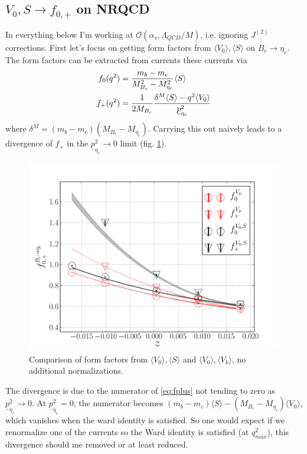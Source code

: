 \subsection{$V_0,S\to f_{0,+}$ on NRQCD}
\label{sec:V0Sf0p}

In everything below I'm working at $\mathcal{O}(\alpha_s,\Lambda_{QCD}/M)$, i.e. ignoring $J^{(2)}$ corrections. First let's focus on getting form factors from $\langle V_0 \rangle, \langle S \rangle$ on $B_c\to\eta_c$. The form factors can be extracted from currents these currents via
\begin{align}
	f_0(q^2) &= { m_b - m_c \over M_{B_c}^2-M_{\eta_c}^2 } \langle S \rangle \\
	f_+(q^2) &= {1\over 2M_{B_c}} { \delta^M  \langle S \rangle - q^2 \langle V_0 \rangle 
		\over \underline{p}^2_{\eta_c} }
		\label{eq:fplus}
\end{align}
where $\delta^M = (m_b-m_c)(M_{B_c}-M_{\eta_c})$. Carrying this out naively leads to a divergence of $f_+$ in the $\underline{p}_{\eta_c}^2\to 0$ limit (fig. \ref{fig:naive}).
\begin{figure}[htb!]
\centering
\includegraphics[scale=0.65]{images/NRQCD/Bcetac_bothways_noV0norm.pdf}
\caption{Comparison of form factors from $\langle V_0 \rangle, \langle S \rangle$ and $\langle V_0 \rangle,\langle V_k \rangle$, no additional normalizations.}
\label{fig:naive}
\end{figure}
The divergence is due to the numerator of \eqref{eq:fplus} not tending to zero as $\underline{p}_{\eta_c}^2\to 0$. At $\underline{p}_{\eta_c}^2 = 0$, the numerator becomes $(m_b-m_c) \langle S \rangle - (M_{B_c}-M_{\eta_c}) \langle V_0 \rangle$, which vanishes when the ward identity is satisfied. So one would expect if we renormalize one of the currents so the Ward identity is satisfied (at $q^2_{max}$), this divergence should me removed or at least reduced.
